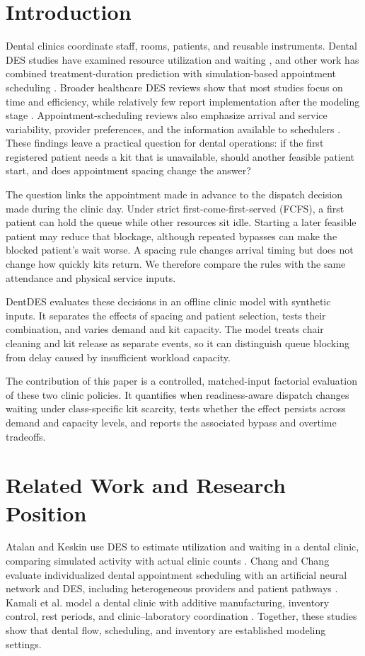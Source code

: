 \documentclass[conference]{IEEEtran}
\begin{document}
\section{Introduction}
Dental clinics coordinate staff, rooms, patients, and reusable instruments. Dental DES studies have examined resource utilization and waiting \cite{atalan2023}, and other work has combined treatment-duration prediction with simulation-based appointment scheduling \cite{chang2018}. Broader healthcare DES reviews show that most studies focus on time and efficiency, while relatively few report implementation after the modeling stage \cite{gunal2010,vazquez2021}. Appointment-scheduling reviews also emphasize arrival and service variability, provider preferences, and the information available to schedulers \cite{cayirli2003,gupta2008}. These findings leave a practical question for dental operations: if the first registered patient needs a kit that is unavailable, should another feasible patient start, and does appointment spacing change the answer?

The question links the appointment made in advance to the dispatch decision made during the clinic day. Under strict first-come-first-served (FCFS), a first patient can hold the queue while other resources sit idle. Starting a later feasible patient may reduce that blockage, although repeated bypasses can make the blocked patient's wait worse. A spacing rule changes arrival timing but does not change how quickly kits return. We therefore compare the rules with the same attendance and physical service inputs.

DentDES evaluates these decisions in an offline clinic model with synthetic inputs. It separates the effects of spacing and patient selection, tests their combination, and varies demand and kit capacity. The model treats chair cleaning and kit release as separate events, so it can distinguish queue blocking from delay caused by insufficient workload capacity.

The contribution of this paper is a controlled, matched-input factorial evaluation of these two clinic policies. It quantifies when readiness-aware dispatch changes waiting under class-specific kit scarcity, tests whether the effect persists across demand and capacity levels, and reports the associated bypass and overtime tradeoffs.

\section{Related Work and Research Position}
Atalan and Keskin use DES to estimate utilization and waiting in a dental clinic, comparing simulated activity with actual clinic counts \cite{atalan2023}. Chang and Chang evaluate individualized dental appointment scheduling with an artificial neural network and DES, including heterogeneous providers and patient pathways \cite{chang2018}. Kamali et al. model a dental clinic with additive manufacturing, inventory control, rest periods, and clinic--laboratory coordination \cite{kamali2022}. Together, these studies show that dental flow, scheduling, and inventory are established modeling settings.
\end{document}
